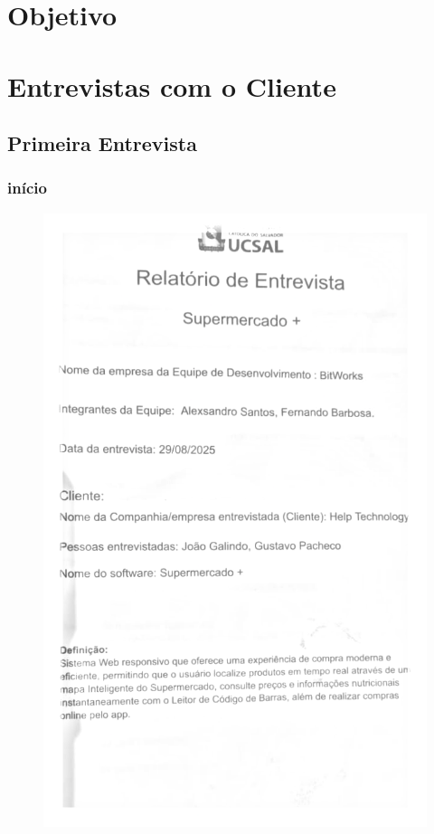\documentclass[12pt,oneside,a4paper,article]{abntex2}
\begin{document}
    \section{Objetivo}
    
    \vspace{12mm}   
    
    \newpage                                        
    \section{Entrevistas com o Cliente} 
    
    \subsection{Primeira Entrevista}
    \vspace{12mm}
    
    \subsubsection{início}
    \begin{figure}[H]
        \centering
        \includegraphics[width=0.75\linewidth]{imagens-template/Entrevista1/Editado4.png}
        \label{fig:placeholder}
    \end{figure}
    
\end{document}
